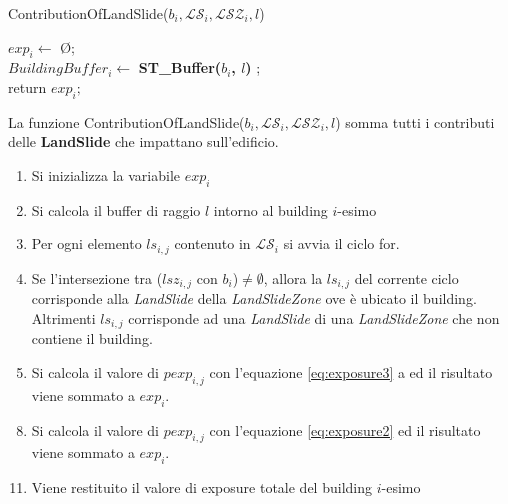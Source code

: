 \begin{algorithm}[H]
	
	\IncMargin{1em}
	\caption{ContributionOfLandSlide($b_i , \mathcal{LS}_i, \mathcal{LSZ}_i, l $) }
	\label{alg:four}
	\BlankLine
	\SetAlgoNoLine
	
	$ exp_i \leftarrow$ \O ;\\
	$ BuildingBuffer_i  \leftarrow $ \textbf{ST\_Buffer($b_i$, $l$)} ;\\
	return $exp_i;$
\end{algorithm}
La funzione ContributionOfLandSlide($b_i , \mathcal{LS}_i, \mathcal{LSZ}_i, l $) somma tutti i contributi delle \textbf{LandSlide} che impattano sull'edificio.
\begin{enumerate}
	\item Si inizializza la variabile $exp_i$ 
	\item Si calcola il buffer di raggio $l$ intorno al building $i$-esimo
	\item Per ogni elemento $ls_{i,j}$ contenuto in $\mathcal{LS}_i $ si avvia il ciclo for.
	\item Se l'intersezione tra ($lsz_{i,j}$ con $b_i$)$\not=\emptyset$, allora la $ls_{i,j}$ del corrente ciclo corrisponde alla	\textit{LandSlide} della \textit{LandSlideZone} ove è ubicato il building.\\
	Altrimenti $ls_{i,j}$ corrisponde ad una \textit{LandSlide} di una \textit{LandSlideZone} che non contiene il building. 
	\item Si calcola il valore di $pexp_{i,j}$ con l'equazione \ref{eq:exposure3} a ed il risultato viene sommato a $exp_i$.
\end{enumerate}
\begin{enumerate}
	\setcounter{enumi}{7}
	\item Si calcola il valore di $pexp_{i,j}$ con l'equazione \ref{eq:exposure2} ed il risultato viene sommato a $exp_i$. 
\end{enumerate}
\begin{enumerate}
	\setcounter{enumi}{10}
	\item Viene restituito il valore di exposure totale del building $i$-esimo
\end{enumerate}
